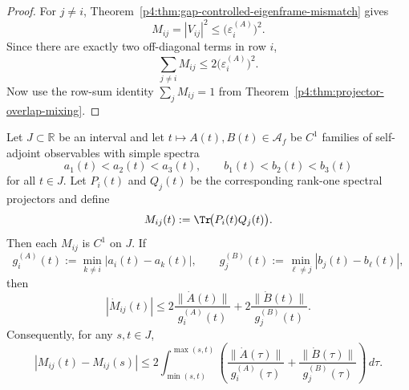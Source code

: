 \documentclass[12pt,a4paper]{article}
\begin{document}
\begin{proof}
For $j\neq i$, Theorem~\ref{p4:thm:gap-controlled-eigenframe-mismatch} gives
\[
M_{ij}=|V_{ij}|^2\le \bigl(\varepsilon_i^{(A)}\bigr)^2.
\]
Since there are exactly two off-diagonal terms in row $i$,
\[
\sum_{j\neq i}M_{ij}\le 2\bigl(\varepsilon_i^{(A)}\bigr)^2.
\]
Now use the row-sum identity $\sum_j M_{ij}=1$ from Theorem~\ref{p4:thm:projector-overlap-mixing}.
\end{proof}


\begin{theorem}
\label{p4:thm:transport-stability-projector-overlaps}
Let $J\subset\mathbb R$ be an interval and let $t\mapsto A(t),B(t)\in\mathcal A_f$ be $C^1$ families of self-adjoint observables with simple spectra
\[
a_1(t)<a_2(t)<a_3(t),
\qquad
b_1(t)<b_2(t)<b_3(t)
\]
for all $t\in J$.
Let $P_i(t)$ and $Q_j(t)$ be the corresponding rank-one spectral projectors and define
\begin{equation}
\label{p4:eq:transport-overlap-matrix}
M_{ij}(t):=\Tr\!\bigl(P_i(t)Q_j(t)\bigr).
\end{equation}
Then each $M_{ij}$ is $C^1$ on $J$.
If
\[
g_i^{(A)}(t):=\min_{k\neq i}|a_i(t)-a_k(t)|,
\qquad
g_j^{(B)}(t):=\min_{\ell\neq j}|b_j(t)-b_\ell(t)|,
\]
then
\begin{equation}
\label{p4:eq:transport-overlap-derivative-bound}
|\dot M_{ij}(t)|
\le
2\frac{\|\dot A(t)\|}{g_i^{(A)}(t)}
+
2\frac{\|\dot B(t)\|}{g_j^{(B)}(t)}.
\end{equation}
Consequently, for any $s,t\in J$,
\begin{equation}
\label{p4:eq:transport-overlap-integrated-bound}
|M_{ij}(t)-M_{ij}(s)|
\le
2\int_{\min(s,t)}^{\max(s,t)}
\left(
\frac{\|\dot A(\tau)\|}{g_i^{(A)}(\tau)}
+
\frac{\|\dot B(\tau)\|}{g_j^{(B)}(\tau)}
\right)\,d\tau.
\end{equation}
\end{theorem}
\end{document}
